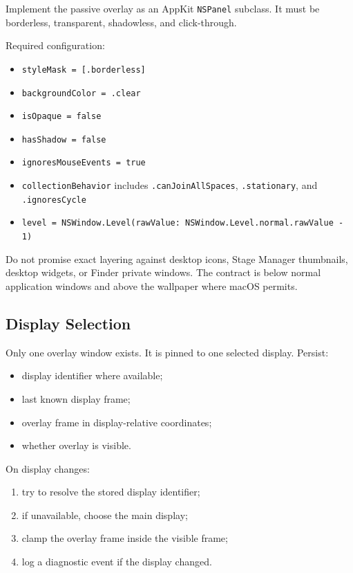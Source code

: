 \documentclass[11pt]{article}
\begin{document}
Implement the passive overlay as an AppKit \texttt{NSPanel} subclass. It must be borderless, transparent, shadowless, and click-through.

Required configuration:
\begin{itemize}
  \item \texttt{styleMask = [.borderless]}
  \item \texttt{backgroundColor = .clear}
  \item \texttt{isOpaque = false}
  \item \texttt{hasShadow = false}
  \item \texttt{ignoresMouseEvents = true}
  \item \texttt{collectionBehavior} includes \texttt{.canJoinAllSpaces}, \texttt{.stationary}, and \texttt{.ignoresCycle}
  \item \texttt{level = NSWindow.Level(rawValue: NSWindow.Level.normal.rawValue - 1)}
\end{itemize}

Do not promise exact layering against desktop icons, Stage Manager thumbnails, desktop widgets, or Finder private windows. The contract is below normal application windows and above the wallpaper where macOS permits.

\subsection{Display Selection}

Only one overlay window exists. It is pinned to one selected display. Persist:
\begin{itemize}
  \item display identifier where available;
  \item last known display frame;
  \item overlay frame in display-relative coordinates;
  \item whether overlay is visible.
\end{itemize}

On display changes:
\begin{enumerate}
  \item try to resolve the stored display identifier;
  \item if unavailable, choose the main display;
  \item clamp the overlay frame inside the visible frame;
  \item log a diagnostic event if the display changed.
\end{enumerate}
\end{document}
